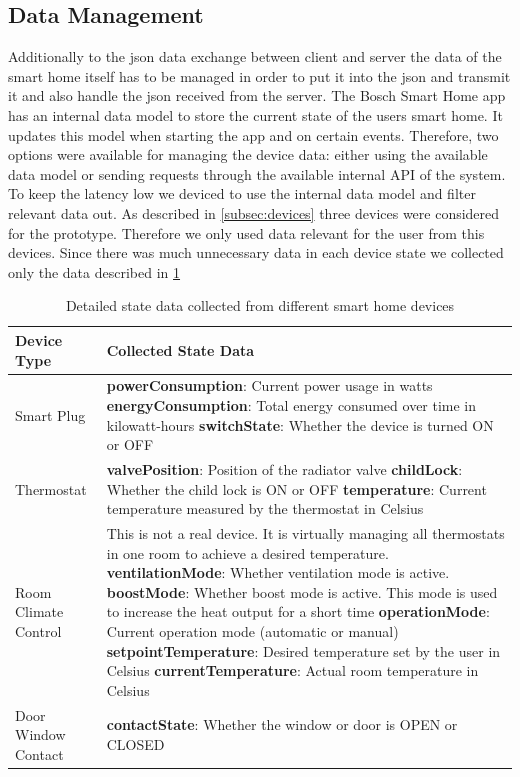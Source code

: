 \subsection{Data Management}
Additionally to the \gls{json} data exchange between client and server the data of the smart home itself has to be managed in order to put it into the \gls{json} and transmit it and also handle the \gls{json} received from the server.
The Bosch Smart Home app has an internal data model to store the current state of the users smart home. It updates this model when starting the app and on certain events.
Therefore, two options were available for managing the device data: either using the available data model or sending requests through the available internal API of the system.
To keep the latency low we deviced to use the internal data model and filter relevant data out. As described in \cref{subsec:devices} three devices were considered for the prototype.
Therefore we only used data relevant for the user from this devices. Since there was much unnecessary data in each device state we collected only the data described in \cref{tab:device_state_data_detailed}
\begin{table}[h!]
    \centering
    \begin{tabularx}{\textwidth}{|p{3cm}|X|}
    \hline
    \textbf{Device Type} & \textbf{Collected State Data} \\ \hline
    Smart Plug & 
    \textbf{powerConsumption}: Current power usage in watts \newline
    \textbf{energyConsumption}: Total energy consumed over time in kilowatt-hours \newline
    \textbf{switchState}: Whether the device is turned ON or OFF \\ \hline
    Thermostat & 
    \textbf{valvePosition}: Position of the radiator valve \newline
    \textbf{childLock}: Whether the child lock is ON or OFF \newline
    \textbf{temperature}: Current temperature measured by the thermostat in Celsius \\ \hline
    Room Climate Control & 
    This is not a real device. It is virtually managing all thermostats in one room to achieve a desired temperature.
    \textbf{ventilationMode}: Whether ventilation mode is active. \newline
    \textbf{boostMode}: Whether boost mode is active. This mode is used to increase the heat output for a short time \newline
    \textbf{operationMode}: Current operation mode (automatic or manual) \newline
    \textbf{setpointTemperature}: Desired temperature set by the user in Celsius \newline
    \textbf{currentTemperature}: Actual room temperature in Celsius \\ \hline
    Door Window Contact & 
    \textbf{contactState}: Whether the window or door is OPEN or CLOSED \\ \hline
    \end{tabularx}
    \caption{Detailed state data collected from different smart home devices}
    \label{tab:device_state_data_detailed}
\end{table}

